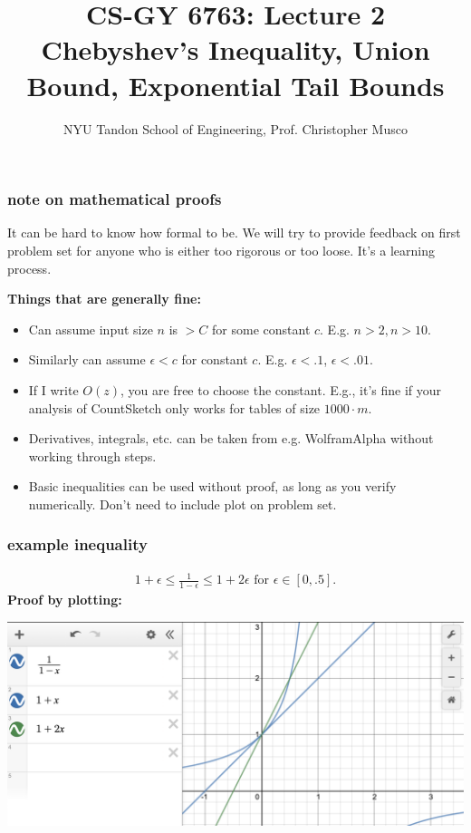 \documentclass[handout,compress]{beamer}
\title{CS-GY 6763: Lecture 2 \\ Chebyshev's Inequality, Union Bound, Exponential Tail Bounds}
\author{NYU Tandon School of Engineering, Prof. Christopher Musco}
\date{}
\begin{document}
\begin{frame}
	\titlepage 
\end{frame}

\begin{frame}
	\frametitle{note on mathematical proofs}
	\small
	It can be hard to know how formal to be. We will try to provide feedback on first problem set for anyone who is either too rigorous or too loose. It's a learning process.
	
	\textbf{Things that are generally fine:}
	\begin{itemize}
		\item Can assume input size $n$ is $> C$ for some constant $c$. E.g. $n > 2, n> 10$.
		\item Similarly can assume $\epsilon < c$ for constant $c$. E.g. $\epsilon < .1$, $\epsilon < .01$.
		\item If I write $O(z)$, you are free to choose the constant. E.g., it's fine if your analysis of CountSketch only works for tables of size $1000\cdot m$. 
		\item Derivatives, integrals, etc. can be taken from e.g. WolframAlpha without working through steps.
		\item Basic inequalities can be used {without proof}, as long as you verify numerically. Don't need to include plot on problem set.
	\end{itemize}
\end{frame}

\begin{frame}
	\frametitle{example inequality}
	\begin{align*}
		1+\epsilon \leq \frac{1}{1-\epsilon} \leq 1+ 2\epsilon \text{ for } \epsilon \in [0,.5].
	\end{align*}
\textbf{Proof by plotting:}
\begin{center}
	\includegraphics[width=\textwidth]{proof1.png}
\end{center}
\end{frame}
\end{document}

